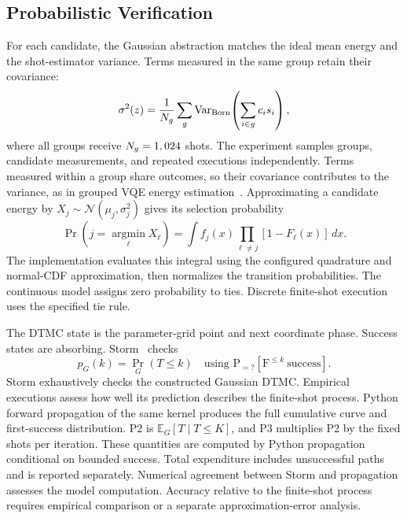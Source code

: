 \documentclass[conference]{IEEEtran}
\begin{document}
\subsection{Probabilistic Verification}
\label{sec:probabilistic}
For each candidate, the Gaussian abstraction matches the ideal mean energy and the shot-estimator variance. Terms measured in the same group retain their covariance:
\begin{equation}
 \sigma^2(z)=\frac{1}{N_g}\sum_g
 \operatorname{Var}_{\rm Born}\!\left(\sum_{i\in g}c_i s_i\right),
 \label{eq:variance}
\end{equation}
where all groups receive $N_g=1,024$ shots. The experiment samples groups, candidate measurements, and repeated executions independently. Terms measured within a group share outcomes, so their covariance contributes to the variance, as in grouped VQE energy estimation~\cite{mcclean2016,tilly2022}. Approximating a candidate energy by $X_j\sim\mathcal N(\mu_j,\sigma_j^2)$ gives its selection probability
\begin{equation}
 \Pr(j=\operatorname*{argmin}_\ell X_\ell)
 =\int f_j(x)\prod_{\ell\ne j}[1-F_\ell(x)]\,dx.
 \label{eq:selection}
\end{equation}
The implementation evaluates this integral using the configured quadrature and normal-CDF approximation, then normalizes the transition probabilities. The continuous model assigns zero probability to ties. Discrete finite-shot execution uses the specified tie rule.

The DTMC state is the parameter-grid point and next coordinate phase. Success states are absorbing. Storm~\cite{storm} checks
\begin{equation}
 p_G(k)=\Pr_G(T\leq k)
 \quad\text{using }\mathrm{P}_{=?}[\mathrm F^{\leq k}\ \mathrm{success}].
 \label{eq:reachability}
\end{equation}
Storm exhaustively checks the constructed Gaussian DTMC. Empirical executions assess how well its prediction describes the finite-shot process. Python forward propagation of the same kernel produces the full cumulative curve and first-success distribution. P2 is $\mathbb E_G[T\mid T\leq K]$, and P3 multiplies P2 by the fixed shots per iteration. These quantities are computed by Python propagation conditional on bounded success. Total expenditure includes unsuccessful paths and is reported separately. Numerical agreement between Storm and propagation assesses the model computation. Accuracy relative to the finite-shot process requires empirical comparison or a separate approximation-error analysis.
\end{document}
